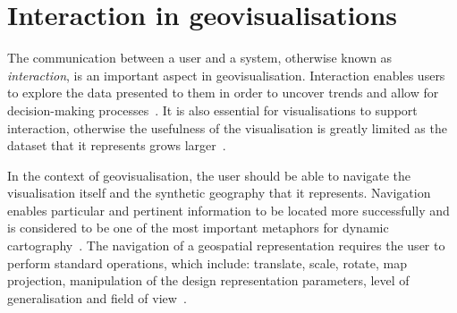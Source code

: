 \section{Interaction in geovisualisations} {

	The communication between a user and a system, otherwise known as \emph{interaction}, is an important aspect in geovisualisation. Interaction enables users to explore the data presented to them in order to uncover trends and allow for decision-making processes~\parencite{yi2007toward}. It is also essential for visualisations to support interaction, otherwise the usefulness of the visualisation is greatly limited as the dataset that it represents grows larger~\parencite{yi2007toward}.

	In the context of geovisualisation, the user should be able to navigate the visualisation itself and the synthetic geography that it represents. Navigation enables particular and pertinent information to be located more successfully and is considered to be one of the most important metaphors for dynamic cartography~\parencite{cartwright2001geospatial}. The navigation of a geospatial representation requires the user to perform standard operations, which include: translate, scale, rotate, map projection, manipulation of the design representation parameters, level of generalisation and field of view~\parencite{cartwright2001geospatial, hand1997survey}.

}


